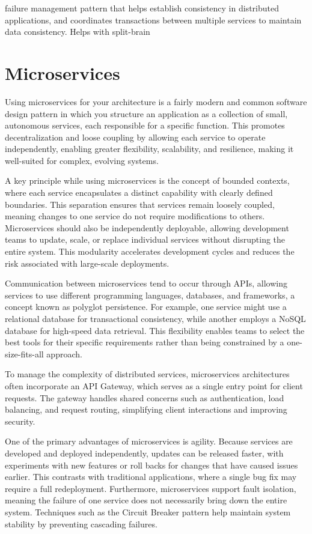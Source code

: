 \documentclass[]{final}
\begin{document}
failure management pattern that helps establish consistency in distributed
applications, and coordinates transactions between multiple services to
maintain data consistency. Helps with split-brain

\section{Microservices}
Using microservices for your architecture is a fairly modern and common software
design pattern in which you structure an application as a collection of small,
autonomous services, each responsible for a specific function. This promotes
decentralization and loose coupling by allowing each service to operate
independently, enabling greater flexibility, scalability, and resilience,
making it well-suited for complex, evolving systems.

A key principle while using microservices is the concept of bounded contexts,
where each service encapsulates a distinct capability with clearly defined
boundaries. This separation ensures that services remain loosely coupled,
meaning changes to one service do not require modifications to others.
Microservices should also be independently deployable, allowing development
teams to update, scale, or replace individual services without disrupting
the entire system. This modularity accelerates development cycles and
reduces the risk associated with large-scale deployments.

Communication between microservices tend to occur through APIs, allowing
services to use different programming languages, databases, and frameworks,
a concept known as polyglot persistence. For example, one service might use
a relational database for transactional consistency, while another employs a
NoSQL database for high-speed data retrieval. This flexibility enables
teams to select the best tools for their specific requirements rather
than being constrained by a one-size-fits-all approach.

To manage the complexity of distributed services, microservices architectures
often incorporate an API Gateway, which serves as a single entry point for
client requests. The gateway handles shared concerns such as authentication,
load balancing, and request routing, simplifying client interactions and
improving security.

One of the primary advantages of microservices is agility. Because services
are developed and deployed independently, updates can be released
faster, with experiments with new features or roll backs for changes that
have caused issues earlier.
This contrasts with traditional applications, where a single bug fix may
require a full redeployment. Furthermore, microservices support fault
isolation, meaning the failure of one service does not necessarily bring
down the entire system. Techniques such as the Circuit Breaker pattern
help maintain system stability by preventing cascading failures.
\end{document}
